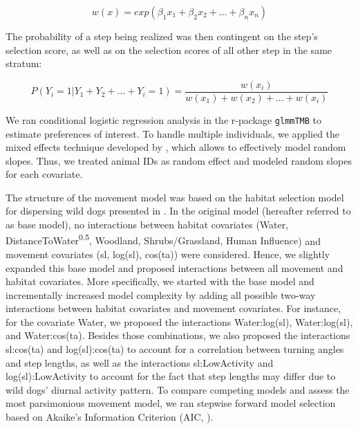 \documentclass[abstract=on,10pt,a4paper,bibliography=totocnumbered]{article}
\begin{document}
\begin{equation}
\label{EQ1}
  w(x) = exp(\beta_1 x_1 + \beta_2 x_2 + ... + \beta_n x_n)
\end{equation}

The probability of a step being realized was then contingent on the step's
selection score, as well as on the selection scores of all other step in the
same stratum:

\begin{equation}
\label{EQ2}
  P(Y_{i} = 1 | Y_{1} + Y_{2} + ... + Y_{i} = 1) =
  \frac{w(x_{i})}{w(x_{1}) + w(x_{2}) + ... + w(x_{i})}
\end{equation}

We ran conditional logistic regression analysis in the r-package {\tt glmmTMB}
to estimate preferences of interest. To handle multiple individuals, we applied
the mixed effects technique developed by \citep{Muff.2020}, which allows to
effectively model random slopes. Thus, we treated animal IDs as random effect
and modeled random slopes for each covariate.

The structure of the movement model was based on the habitat selection model for
dispersing wild dogs presented in \cite{Hofmann.2021}. In the original model
(hereafter referred to as base model), no interactions between habitat
covariates (\textsf{Water, DistanceToWater\textsuperscript{0.5}, Woodland,
Shrubs/Grassland, Human Influence}) and movement covariates (\textsf{sl,
log(sl), cos(ta)}) were considered. Hence, we slightly expanded this base model
and proposed interactions between all movement and habitat covariates. More
specifically, we started with the base model and incrementally increased model
complexity by adding all possible two-way interactions between habitat
covariates and movement covariates. For instance, for the covariate
\textsf{Water}, we proposed the interactions \textsf{Water:log(sl)},
\textsf{Water:log(sl)}, and \textsf{Water:cos(ta)}. Besides those combinations,
we also proposed the interactions \textsf{sl:cos(ta)} and
\textsf{log(sl):cos(ta)} to account for a correlation between turning angles and
step lengths, as well as the interactions \textsf{sl:LowActivity} and
\textsf{log(sl):LowActivity} to account for the fact that step lengths may
differ due to wild dogs' diurnal activity pattern. To compare competing models
and assess the most parsimonious movement model, we ran stepwise forward model
selection based on Akaike's Information Criterion (AIC, \citealp{Burnham.2002}).
\end{document}
